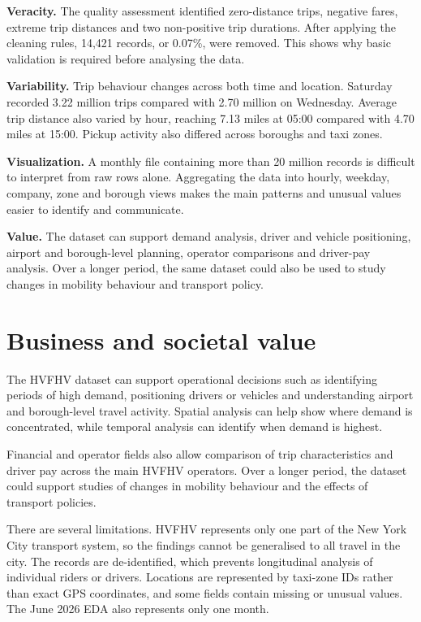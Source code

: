 \documentclass[10pt,twocolumn]{article}
\begin{document}
\textbf{Veracity.}
The quality assessment identified zero-distance trips, negative fares,
extreme trip distances and two non-positive trip durations. After
applying the cleaning rules, 14,421 records, or 0.07\%, were removed.
This shows why basic validation is required before analysing the data.

\textbf{Variability.}
Trip behaviour changes across both time and location. Saturday recorded
3.22 million trips compared with 2.70 million on Wednesday. Average trip
distance also varied by hour, reaching 7.13 miles at 05:00 compared
with 4.70 miles at 15:00. Pickup activity also differed across boroughs
and taxi zones.

\textbf{Visualization.}
A monthly file containing more than 20 million records is difficult to
interpret from raw rows alone. Aggregating the data into hourly,
weekday, company, zone and borough views makes the main patterns and
unusual values easier to identify and communicate.

\textbf{Value.}
The dataset can support demand analysis, driver and vehicle positioning,
airport and borough-level planning, operator comparisons and driver-pay
analysis. Over a longer period, the same dataset could also be used to
study changes in mobility behaviour and transport policy.


\section{Business and societal value}

The HVFHV dataset can support operational decisions such as identifying
periods of high demand, positioning drivers or vehicles and understanding
airport and borough-level travel activity. Spatial analysis can help show
where demand is concentrated, while temporal analysis can identify when
demand is highest.

Financial and operator fields also allow comparison of trip
characteristics and driver pay across the main HVFHV operators. Over a
longer period, the dataset could support studies of changes in mobility
behaviour and the effects of transport policies.

There are several limitations. HVFHV represents only one part of the
New York City transport system, so the findings cannot be generalised to
all travel in the city. The records are de-identified, which prevents
longitudinal analysis of individual riders or drivers. Locations are
represented by taxi-zone IDs rather than exact GPS coordinates, and some
fields contain missing or unusual values. The June 2026 EDA also
represents only one month.
\end{document}
